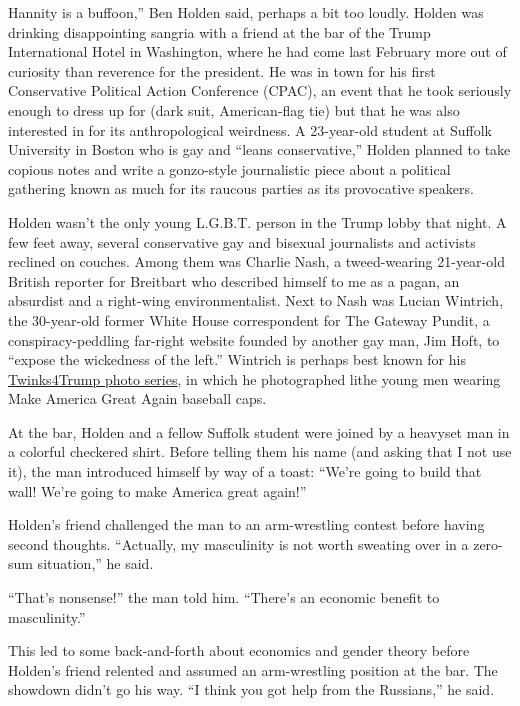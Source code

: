 Hannity is a buffoon,'' Ben Holden said, perhaps a bit too loudly.
Holden was drinking disappointing sangria with a friend at the bar of
the Trump International Hotel in Washington, where he had come last
February more out of curiosity than reverence for the president. He was
in town for his first Conservative Political Action Conference (CPAC),
an event that he took seriously enough to dress up for (dark suit,
American-flag tie) but that he was also interested in for its
anthropological weirdness. A 23-year-old student at Suffolk University
in Boston who is gay and ``leans conservative,'' Holden planned to take
copious notes and write a gonzo-style journalistic piece about a
political gathering known as much for its raucous parties as its
provocative speakers.

Holden wasn't the only young L.G.B.T. person in the Trump lobby that
night. A few feet away, several conservative gay and bisexual
journalists and activists reclined on couches. Among them was Charlie
Nash, a tweed-wearing 21-year-old British reporter for Breitbart who
described himself to me as a pagan, an absurdist and a right-wing
environmentalist. Next to Nash was Lucian Wintrich, the 30-year-old
former White House correspondent for The Gateway Pundit, a
conspiracy-peddling far-right website founded by another gay man, Jim
Hoft, to ``expose the wickedness of the left.'' Wintrich is perhaps best
known for his
\href{https://broadly.vice.com/en_us/article/ypaab7/make-america-hairless-again-sensual-photos-of-twinks-for-trump}{Twinks4Trump
photo series}, in which he photographed lithe young men wearing Make
America Great Again baseball caps.

At the bar, Holden and a fellow Suffolk student were joined by a
heavyset man in a colorful checkered shirt. Before telling them his name
(and asking that I not use it), the man introduced himself by way of a
toast: ``We're going to build that wall! We're going to make America
great again!''

Holden's friend challenged the man to an arm-wrestling contest before
having second thoughts. ``Actually, my masculinity is not worth sweating
over in a zero-sum situation,'' he said.

``That's nonsense!'' the man told him. ``There's an economic benefit to
masculinity.''

This led to some back-and-forth about economics and gender theory before
Holden's friend relented and assumed an arm-wrestling position at the
bar. The showdown didn't go his way. ``I think you got help from the
Russians,'' he said.

